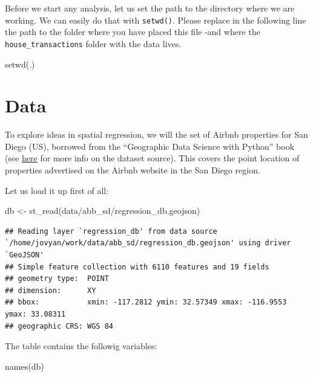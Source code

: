 \documentclass[
]{book}
\newenvironment{Shaded}{\begin{snugshade}}{\end{snugshade}}
\newcommand{\FunctionTok}[1]{\textcolor[rgb]{0.00,0.00,0.00}{#1}}
\newcommand{\NormalTok}[1]{#1}
\newcommand{\OtherTok}[1]{\textcolor[rgb]{0.56,0.35,0.01}{#1}}
\newcommand{\StringTok}[1]{\textcolor[rgb]{0.31,0.60,0.02}{#1}}
\begin{document}
Before we start any analysis, let us set the path to the directory where we are working. We can easily do that with \texttt{setwd()}. Please replace in the following line the path to the folder where you have placed this file -and where the \texttt{house\_transactions} folder with the data lives.

\begin{Shaded}
\begin{Highlighting}[]
\FunctionTok{setwd}\NormalTok{(}\StringTok{\textquotesingle{}.\textquotesingle{}}\NormalTok{)}
\end{Highlighting}
\end{Shaded}

\hypertarget{data-2}{%
\section{Data}\label{data-2}}

To explore ideas in spatial regression, we will the set of Airbnb properties for San Diego (US), borrowed from the ``Geographic Data Science with Python'' book (see \href{https://geographicdata.science/book/data/airbnb/regression_cleaning.html}{here} for more info on the dataset source). This covers the point location of properties advertised on the Airbnb website in the San Diego region.

Let us load it up first of all:

\begin{Shaded}
\begin{Highlighting}[]
\NormalTok{db }\OtherTok{\textless{}{-}} \FunctionTok{st\_read}\NormalTok{(}\StringTok{\textquotesingle{}data/abb\_sd/regression\_db.geojson\textquotesingle{}}\NormalTok{)}
\end{Highlighting}
\end{Shaded}

\begin{verbatim}
## Reading layer `regression_db' from data source `/home/jovyan/work/data/abb_sd/regression_db.geojson' using driver `GeoJSON'
## Simple feature collection with 6110 features and 19 fields
## geometry type:  POINT
## dimension:      XY
## bbox:           xmin: -117.2812 ymin: 32.57349 xmax: -116.9553 ymax: 33.08311
## geographic CRS: WGS 84
\end{verbatim}

The table contains the followig variables:

\begin{Shaded}
\begin{Highlighting}[]
\FunctionTok{names}\NormalTok{(db)}
\end{Highlighting}
\end{Shaded}
\end{document}
